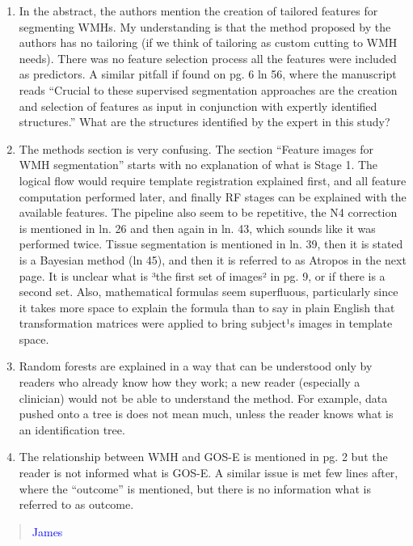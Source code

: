 \documentclass[12pt,]{article}
\begin{document}
\begin{enumerate}
\def\labelenumi{\arabic{enumi}.}
\setcounter{enumi}{4}
\item
  In the abstract, the authors mention the creation of tailored features
  for segmenting WMHs. My understanding is that the method proposed by
  the authors has no tailoring (if we think of tailoring as custom
  cutting to WMH needs). There was no feature selection process all the
  features were included as predictors. A similar pitfall if found on
  pg. 6 ln 56, where the manuscript reads ``Crucial to these supervised
  segmentation approaches are the creation and selection of features as
  input in conjunction with expertly identified structures.'' What are
  the structures identified by the expert in this study?
\item
  The methods section is very confusing. The section ``Feature images
  for WMH segmentation'' starts with no explanation of what is Stage 1.
  The logical flow would require template registration explained first,
  and all feature computation performed later, and finally RF stages can
  be explained with the available features. The pipeline also seem to be
  repetitive, the N4 correction is mentioned in ln. 26 and then again in
  ln. 43, which sounds like it was performed twice. Tissue segmentation
  is mentioned in ln. 39, then it is stated is a Bayesian method (ln
  45), and then it is referred to as Atropos in the next page. It is
  unclear what is ³the first set of images² in pg. 9, or if there is a
  second set. Also, mathematical formulas seem superfluous, particularly
  since it takes more space to explain the formula than to say in plain
  English that transformation matrices were applied to bring subject¹s
  images in template space.
\item
  Random forests are explained in a way that can be understood only by
  readers who already know how they work; a new reader (especially a
  clinician) would not be able to understand the method. For example,
  data pushed onto a tree is does not mean much, unless the reader knows
  what is an identification tree.
\item
  The relationship between WMH and GOS-E is mentioned in pg. 2 but the
  reader is not informed what is GOS-E. A similar issue is met few lines
  after, where the ``outcome'' is mentioned, but there is no information
  what is referred to as outcome.
\end{enumerate}

\begin{quote}
\textcolor{blue}{James}
\end{quote}
\end{document}
